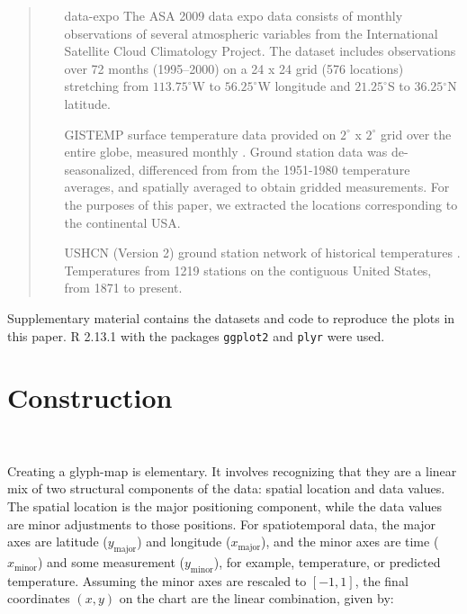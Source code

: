 \documentclass[oneside]{article}
\newcommand\amin{\text{minor}}
\newcommand\amaj{\text{major}}
\begin{document}
\begin{quote}
\begin{itemize} \itemsep 0in

\item[data-expo] The ASA 2009 data expo data \citep{murrell:2010} consists
  of monthly observations of several atmospheric variables from the
  International Satellite Cloud Climatology Project. The dataset
  includes observations over 72 months (1995--2000) on a 24 x 24 grid
  (576 locations) stretching from $113.75^{\circ}$W to
  $56.25^{\circ}$W longitude and $21.25^{\circ}$S to $36.25{^\circ}$N
  latitude.

\item[GISTEMP] surface temperature data provided on $2^{\circ}$ x
  $2^{\circ}$ grid over the entire globe, measured monthly \citep{GISTEMP}. Ground
  station data was de-seasonalized, differenced from from the
  1951-1980 temperature averages, and spatially averaged to obtain
  gridded measurements. For the purposes of this paper, we extracted
  the locations corresponding to the continental USA. 

\item[USHCN] (Version 2) ground station network of historical
  temperatures \citep{USHCN}. Temperatures from 1219 stations on the
  contiguous United States, from 1871 to present.
  
\end{itemize}
\end{quote}
Supplementary material contains the datasets and code to reproduce the plots in this paper.  R 2.13.1 \citep{R} with the packages {\tt ggplot2} \citep{me:ggplot2} and {\tt plyr} \citep{me:plyr} were used. 


\section{Construction}~\label{sec:construction}

Creating a glyph-map is elementary. It involves recognizing that they are a linear mix of two structural components of the data: spatial location and data values. The spatial location is the major positioning component, while the data values are minor adjustments to those positions. For spatiotemporal data, the major axes are latitude ($y_{\amaj}$) and longitude ($x_{\amaj}$), and the minor axes are time ($x_{\amin}$) and some measurement ($y_{\amin}$), for example, temperature, or predicted temperature. Assuming the minor axes are rescaled to $[-1, 1]$, the final coordinates $(x,y)$ on the chart are the linear combination, given by:
\end{document}
